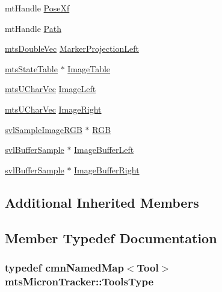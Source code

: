 \begin{DoxyCompactItemize}
\item 
mt\-Handle \hyperlink{classmts_micron_tracker_aaa5b0c0dc913a0ba93d24e52d2af392c}{Pose\-Xf}
\item 
mt\-Handle \hyperlink{classmts_micron_tracker_a671813b6e8c02f16f6bd5b45e2c0a7f4}{Path}
\item 
\hyperlink{mts_vector_8h_af69167a5dc2ad33eb93965b9387d8403}{mts\-Double\-Vec} \hyperlink{classmts_micron_tracker_a1ff396c1b97679eeffa92914bca1ac4c}{Marker\-Projection\-Left}
\item 
\hyperlink{classmts_state_table}{mts\-State\-Table} $\ast$ \hyperlink{classmts_micron_tracker_af70cb9ac4628c9f3d8d8a902baf5f831}{Image\-Table}
\item 
\hyperlink{mts_vector_8h_af820219f2f2497ada1dfccfa2747982a}{mts\-U\-Char\-Vec} \hyperlink{classmts_micron_tracker_aac820722ad86e7563f8eea1499a61ab3}{Image\-Left}
\item 
\hyperlink{mts_vector_8h_af820219f2f2497ada1dfccfa2747982a}{mts\-U\-Char\-Vec} \hyperlink{classmts_micron_tracker_a07b7942fd2fd04d1849cd39189c7e93a}{Image\-Right}
\item 
\hyperlink{svl_sample_image_types_8h_a54a55112dd3879f71f990d2945375f1a}{svl\-Sample\-Image\-R\-G\-B} $\ast$ \hyperlink{classmts_micron_tracker_a891e38ee9165abc0cc182c769eff7de6}{R\-G\-B}
\item 
\hyperlink{classsvl_buffer_sample}{svl\-Buffer\-Sample} $\ast$ \hyperlink{classmts_micron_tracker_a98e0dbd21c7d9a238e213888920469f0}{Image\-Buffer\-Left}
\item 
\hyperlink{classsvl_buffer_sample}{svl\-Buffer\-Sample} $\ast$ \hyperlink{classmts_micron_tracker_a9a318503d10e493581cda519e024fd09}{Image\-Buffer\-Right}
\end{DoxyCompactItemize}
\subsection*{Additional Inherited Members}


\subsection{Member Typedef Documentation}
\hypertarget{classmts_micron_tracker_a240bfec6cae665e2f2f53ec31bbcff12}{
\subsubsection[{Tools\-Type}]{\setlength{\rightskip}{0pt plus 5cm}typedef {\bf cmn\-Named\-Map}$<${\bf Tool}$>$ {\bf mts\-Micron\-Tracker\-::\-Tools\-Type}\hspace{0.3cm}{\ttfamily [protected]}}}\label{classmts_micron_tracker_a240bfec6cae665e2f2f53ec31bbcff12}



